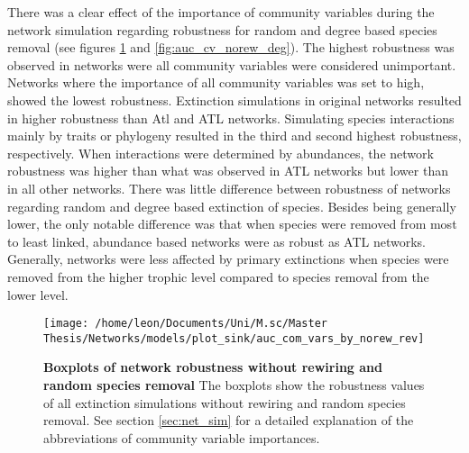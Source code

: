 \documentclass[12pt,a4paper]{article}
\begin{document}
There was a clear effect of the importance of community variables during the network simulation regarding robustness for random and degree based species removal (see figures \ref{fig:auc_cv_norew} and \ref{fig:auc_cv_norew_deg}). The highest robustness was observed in networks were all community variables were considered unimportant. Networks where the importance of all community variables was set to high, showed the lowest robustness. Extinction simulations in original networks resulted in higher robustness than Atl and ATL networks. Simulating species interactions mainly by traits or phylogeny resulted in the third and second highest robustness, respectively. When interactions were determined by abundances, the network robustness was higher than what was observed in ATL networks but lower than in all other networks. There was little difference between robustness of networks regarding random and degree based extinction of species. Besides being generally lower, the only notable difference was that when species were removed from most to least linked, abundance based networks were as robust as ATL networks.
Generally, networks were less affected by primary extinctions when species were removed from the higher trophic level compared to species removal from the lower level. \par


\begin{figure}[H]
	 \centering
	 \texttt{[image: /home/leon/Documents/Uni/M.sc/Master Thesis/Networks/models/plot\_sink/auc\_com\_vars\_by\_norew\_rev]}
	 \captionsetup{width = \textwidth}
	 \caption[Boxplots of network robustness without rewiring and random species removal]{\textbf{Boxplots of network robustness without rewiring and random species removal} The boxplots show the robustness values of all extinction simulations without rewiring and random species removal. See section \ref{sec:net_sim} for a detailed explanation of the abbreviations of community variable importances.}
	 \label{fig:auc_cv_norew}
\end{figure}


\end{document}
